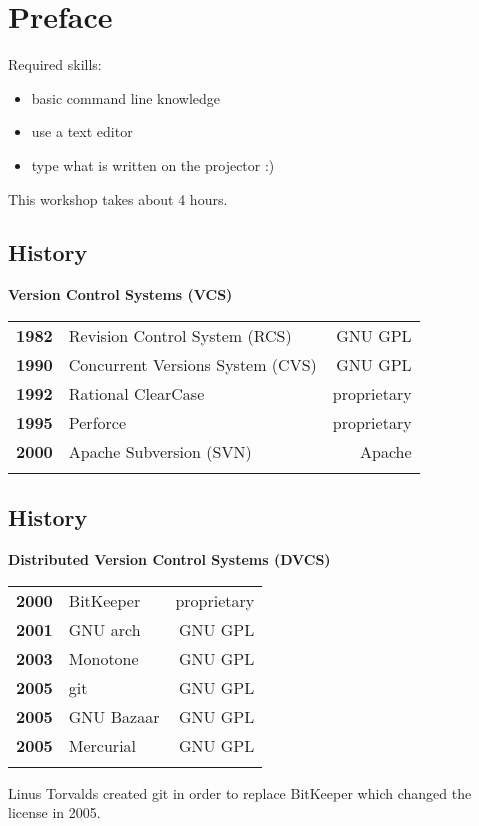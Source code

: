 \section{Preface}
\begin{frame}
  \slidetitle

  Required skills:
  \begin{itemize}
    \item basic command line knowledge
    \item use a text editor
    \item type what is written on the projector :)
  \end{itemize}
  \vspace{1em}
  This workshop takes about 4 hours.
\end{frame}

\subsection{History}
\begin{frame}
  \subslidetitle

  \textbf{Version Control Systems (VCS)}
  \pause
  \\
  \begin{tabular}{lp{5cm}r}
    \textbf{1982} & Revision Control System (RCS) & GNU GPL \\
    \pause
    \textbf{1990} & Concurrent Versions System (CVS) & GNU GPL \\
    \pause
    \textbf{1992} & Rational ClearCase & proprietary \\
    \pause
    \textbf{1995} & Perforce  & proprietary \\
    \pause
    \textbf{2000} & Apache Subversion (SVN)  & Apache \\
    \pause
  \end{tabular}
\end{frame}

\subsection{History}
\begin{frame}
  \subslidetitle
  \textbf{Distributed Version Control Systems (DVCS)}
  \pause
  \\
  \begin{tabular}{lp{5cm}r}
    \textbf{2000} & BitKeeper  & proprietary \\
    \pause
    \textbf{2001} & GNU arch   & GNU GPL \\
    \pause
    \textbf{2003} & Monotone   & GNU GPL \\
    \pause
    \textbf{2005} & git & GNU GPL \\
    \pause
    \textbf{2005} & GNU Bazaar & GNU GPL \\
    \pause
    \textbf{2005} & Mercurial  & GNU GPL \\
    \pause
  \end{tabular}

  Linus Torvalds created git in order to replace BitKeeper which changed the license in 2005.
\end{frame}

